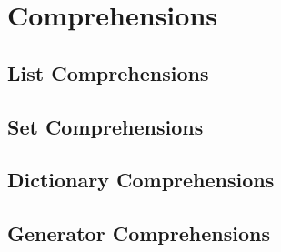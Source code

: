 \section{Comprehensions}

    \subsection{List Comprehensions}

    \subsection{Set Comprehensions}

    \subsection{Dictionary Comprehensions}

    \subsection{Generator Comprehensions}
